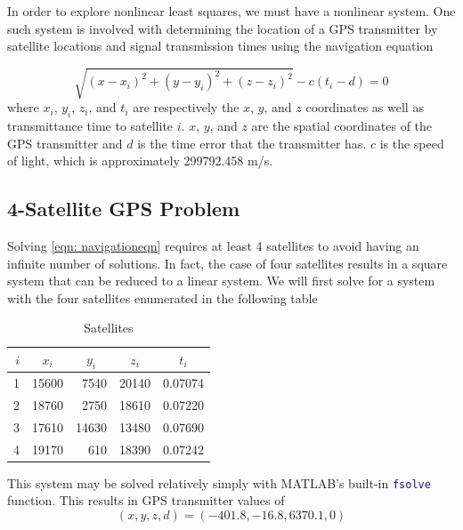 \documentclass[10pt,a4paper]{article}
\begin{document}
In order to explore nonlinear least squares, we must have a nonlinear system. One such system is involved with determining the location of a GPS transmitter by satellite locations and signal transmission times using the navigation equation

\begin{equation}
\sqrt{ \left( x - x_i \right)^2 + \left( y - y_i \right)^2 + \left( z - z_i \right)^2 } - c \left( t_i - d \right) = 0
\label{eqn: navigationeqn}
\end{equation}
where $x_i$, $y_i$, $z_i$, and $t_i$ are respectively the $x$, $y$, and $z$ coordinates as well as transmittance time to satellite $i$. $x$, $y$, and $z$ are the spatial coordinates of the GPS transmitter and $d$ is the time error that the transmitter has. $c$ is the speed of light, which is approximately 299792.458 m/s.

\subsection*{4-Satellite GPS Problem}

Solving \cref{eqn: navigationeqn} requires at least 4 satellites to avoid having an infinite number of solutions. In fact, the case of four satellites results in a square system that can be reduced to a linear system. We will first solve for a system with the four satellites enumerated in the following table

\begin{table}[H]
\centering
\begin{tabular}{r|rrrr}
$i$ & \multicolumn{1}{c}{$x_i$} & \multicolumn{1}{c}{$y_i$} & \multicolumn{1}{c}{$z_i$} & \multicolumn{1}{c}{$t_i$} \\ \hline
1 & 15600                    & 7540                     & 20140                    & 0.07074                  \\
2 & 18760                    & 2750                     & 18610                    & 0.07220                  \\
3 & 17610                    & 14630                    & 13480                    & 0.07690                  \\
4 & 19170                    & 610                      & 18390                    & 0.07242                 
\end{tabular}
\caption{Satellites}
\label{table: satellites}
\end{table}

This system may be solved relatively simply with MATLAB's built-in \lstinline[language=Matlab]|fsolve| function. This results in GPS transmitter values of 
$$
(x,y,z,d) = (-401.8, -16.8, 6370.1, 0)
$$
\end{document}
